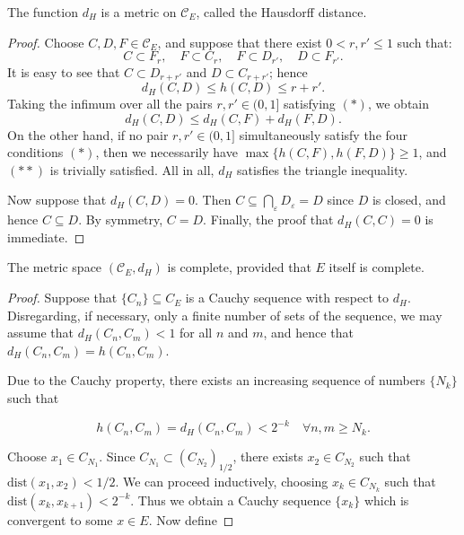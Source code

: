 \documentclass[12pt]{article}
\begin{document}
{\begin{proposition}
    The function $d_H$ is a metric on $\mathcal{C}_E$, called the Hausdorff distance.
\end{proposition}


\begin{proof}
    Choose $C, D, F \in \mathcal{C}_E$, and suppose that there exist $0 < r, r' \leqslant 1$ such that:
    \begin{equation*}
         C \subset F_r, \quad F \subset C_r, \quad F \subset D_{r'}, \quad D \subset F_{r'}. \tag{*}
    \end{equation*} It is easy to see that $C \subset D_{r+r'}$ and $D \subset C_{r+r'}$; hence$$d_H(C, D) \leqslant h(C, D) \leqslant r + r'.$$ Taking the infimum over all the pairs $r, r' \in (0, 1]$ satisfying $(*)$, we obtain
    \begin{equation*}
        d_H(C, D) \leqslant d_H(C, F) + d_H(F, D). \tag{**}
    \end{equation*}On the other hand, if no pair $r, r' \in (0, 1]$ simultaneously satisfy the four conditions $(*)$, then we necessarily have $\max\{h(C, F), h(F, D)\} \geqslant 1$, and $(**)$ is trivially satisfied. All in all, $d_H$ satisfies the triangle inequality.
    
    Now suppose that $d_H(C, D) = 0$. Then $C \subseteq \bigcap_\varepsilon D_\varepsilon = D$ since $D$ is closed, and hence $C \subseteq D$. By symmetry, $C = D$. Finally, the proof that $d_H(C, C) = 0$ is immediate.
\end{proof}

\begin{proposition}[Completeness]
    The metric space $(\mathcal{C}_E,d_H)$ is complete, provided that $E$ itself is complete.
\end{proposition}

\begin{proof}
    Suppose that $\{C_n\} \subseteq C_E$ is a Cauchy sequence with respect to $d_H$. Disregarding, if necessary, only a finite number of sets of the sequence, we may assume that $d_H(C_n, C_m) < 1$ for all $n$ and $m$, and hence that $d_H(C_n, C_m) = h(C_n, C_m)$.
    
    Due to the Cauchy property, there exists an increasing sequence of numbers $\{N_k\}$ such that
    
    $$h(C_n, C_m) = d_H(C_n, C_m) < 2^{-k} \quad \forall n, m \ge N_k.$$
    
    Choose $x_1 \in C_{N_1}$. Since $C_{N_1} \subset (C_{N_2})_{1/2}$, there exists $x_2 \in C_{N_2}$ such that $\text{dist}(x_1, x_2) < 1/2$. We can proceed inductively, choosing $x_k \in C_{N_k}$ such that $\text{dist}(x_k, x_{k+1}) < 2^{-k}$. Thus we obtain a Cauchy sequence $\{x_k\}$ which is convergent to some $x \in E$. Now define
    

\end{proof}}
\end{document}
